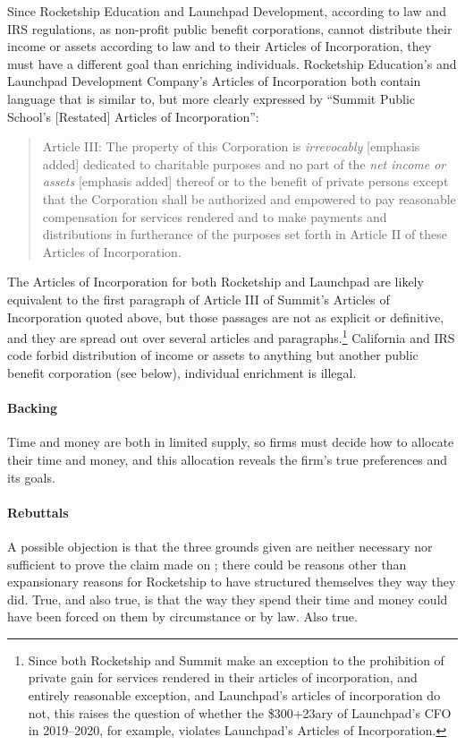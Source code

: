 Since Rocketship Education and Launchpad Development, according to law and IRS regulations, as non-profit public benefit corporations, cannot distribute their income or assets according to law and to their Articles of Incorporation, they must have a different goal than enriching individuals. Rocketship Education's and Launchpad Development Company's Articles of Incorporation both contain language that is similar to, but more clearly expressed by ``Summit Public School's [Restated] Articles of Incorporation'':
\begin{quotation}
  Article III: The property of this Corporation is \textit{irrevocably} [emphasis added] dedicated to charitable purposes and no part of the \textit{net income or assets} [emphasis added] thereof or to the benefit of private persons except that the Corporation shall be authorized and empowered to pay reasonable compensation for services rendered and to make payments and distributions in furtherance of the purposes set forth in Article II of these Articles of Incorporation. \parencite[2]{SummitPublicSchools2017}
\end{quotation}
The Articles of Incorporation for both Rocketship and Launchpad are likely equivalent to the first paragraph of Article III of Summit's Articles of Incorporation quoted above, but those passages are not as explicit or definitive, and they are spread out over several articles and paragraphs.\footnote{Since both Rocketship and Summit make an exception to the prohibition of private gain for services rendered in their articles of incorporation, and entirely reasonable exception, and Launchpad's articles of incorporation do not, this raises the question of whether the \$300+23ary of Launchpad's CFO \parencite[7]{2019LDC990} in 2019–2020, for example, violates Launchpad's Articles of Incorporation.} California and IRS code forbid distribution of income or assets to anything but another public benefit corporation (see  below), individual enrichment is illegal. 


\paragraph{Backing}
Time and money are both in limited supply, so firms must decide how to allocate their time and money, and this allocation reveals the firm's true preferences and its goals.

\paragraph{Rebuttals}
A possible objection is that the three grounds given are neither necessary nor sufficient to prove the claim made on \pageref{p:claim}; there could be reasons other than expansionary reasons for Rocketship to have structured themselves they way they did. True, and also true, is that the way they spend their time and money could have been forced on them by circumstance or by law. Also true.

